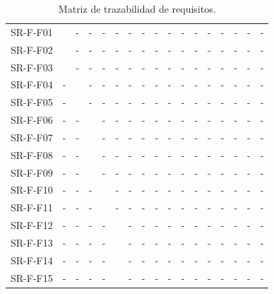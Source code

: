 \begin{table}[htb]
  \centering
  \caption{Matriz de trazabilidad de requisitos.}
  \begin{tabular}{@{}L{3cm}C{0.5cm}C{0.5cm}C{0.5cm}C{0.5cm}C{0.5cm}C{0.5cm}C{0.5cm}C{0.5cm}C{0.5cm}C{0.5cm}C{0.5cm}C{0.5cm}C{0.5cm}C{0.5cm}C{0.5cm}C{0.5cm}@{}}
    \toprule
      &  &  &  & &  &  &  &  &  &  &  &  &  &  &  &  \\
    \midrule
    SR-F-F01 &  & - & - & - & - & - & - & - & - & - & - & - & - & - & - & - \\
    SR-F-F02 &  & - & - & - & - & - & - & - & - & - & - & - & - & - & - & - \\
    SR-F-F03 &  & - & - & - & - & - & - & - & - & - & - & - & - & - & - & - \\
    SR-F-F04 & - &  & - & - & - & - & - & - & - & - & - & - & - & - & - & - \\
    SR-F-F05 & - &  & - & - & - & - & - & - & - & - & - & - & - & - & - & - \\
    SR-F-F06 & - & - &  & - & - & - & - & - & - & - & - & - & - & - & - & - \\
    SR-F-F07 & - & - &  & - & - & - & - & - & - & - & - & - & - & - & - & - \\
    SR-F-F08 & - & - &  & - & - & - & - & - & - & - & - & - & - & - & - & - \\
    SR-F-F09 & - & - &  & - & - & - & - & - & - & - & - & - & - & - & - & - \\
    SR-F-F10 & - & - & - &  & - & - & - & - & - & - & - & - & - & - & - & - \\
    SR-F-F11 & - & - & - &  & - & - & - & - & - & - & - & - & - & - & - & - \\
    SR-F-F12 & - & - & - & - &  & - & - & - & - & - & - & - & - & - & - & - \\
    SR-F-F13 & - & - & - & - &  & - & - & - & - & - & - & - & - & - & - & - \\
    SR-F-F14 & - & - & - & - &  & - & - & - & - & - & - & - & - & - & - & - \\
    SR-F-F15 & - & - & - & - &  & - & - & - & - & - & - & - & - & - & - & - \\

\end{tabular}
\end{table}
